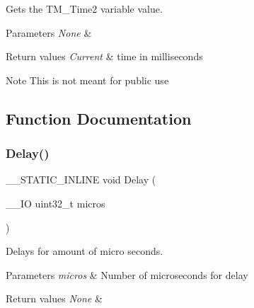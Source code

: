 Gets the T\+M\+\_\+\+Time2 variable value. 


\begin{DoxyParams}{Parameters}
{\em None} & \\
\hline
\end{DoxyParams}

\begin{DoxyRetVals}{Return values}
{\em Current} & time in milliseconds \\
\hline
\end{DoxyRetVals}
\begin{DoxyNote}{Note}
This is not meant for public use 
\end{DoxyNote}


\subsection{Function Documentation}
\mbox{\label{group___t_m___d_e_l_a_y___functions_gae88c9bdf0f377e67efc2c200dc04ab89}} 
\subsubsection{\texorpdfstring{Delay()}{Delay()}}
{\footnotesize\ttfamily \+\_\+\+\_\+\+S\+T\+A\+T\+I\+C\+\_\+\+I\+N\+L\+I\+NE void Delay (\begin{DoxyParamCaption}\item[{\+\_\+\+\_\+\+IO uint32\+\_\+t}]{micros }\end{DoxyParamCaption})}



Delays for amount of micro seconds. 


\begin{DoxyParams}{Parameters}
{\em micros} & Number of microseconds for delay \\
\hline
\end{DoxyParams}

\begin{DoxyRetVals}{Return values}
{\em None} & \\
\hline
\end{DoxyRetVals}
\mbox{\label{group___t_m___d_e_l_a_y___functions_gab5d59e0b5fa9b331871d7fdd5bbad903}} 
